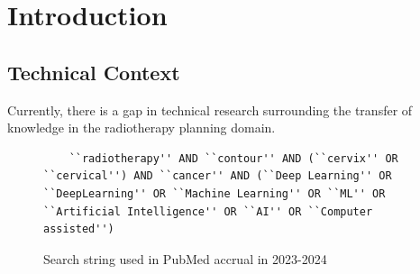 \documentclass[12pt,twoside]{report}
\begin{document}


\clearpage{\pagestyle{empty}\cleardoublepage}
\setcounter{page}{1}
\pagestyle{fancy}




\begin{abstract}\label{sect:abstract}
   

\end{abstract}
  
\tableofcontents
  


\setcounter{page}{1}
\fancyhead[LE,RO]{\slshape \rightmark}
\fancyhead[LO,RE]{\slshape \leftmark}

\chapter{Introduction}



\section{Technical Context}

Currently, there is a gap in technical research surrounding the transfer of knowledge in the radiotherapy planning domain. 

\begin{figure}[H]
  \begin{lstlisting}
    ``radiotherapy'' AND ``contour'' AND (``cervix'' OR ``cervical'') AND ``cancer'' AND (``Deep Learning'' OR ``DeepLearning'' OR ``Machine Learning'' OR ``ML'' OR ``Artificial Intelligence'' OR ``AI'' OR ``Computer assisted'')  
   \end{lstlisting}
   \caption{Search string used in PubMed accrual in 2023-2024}\label{fig:pubmed-search-string}  
\end{figure}
\end{document}
